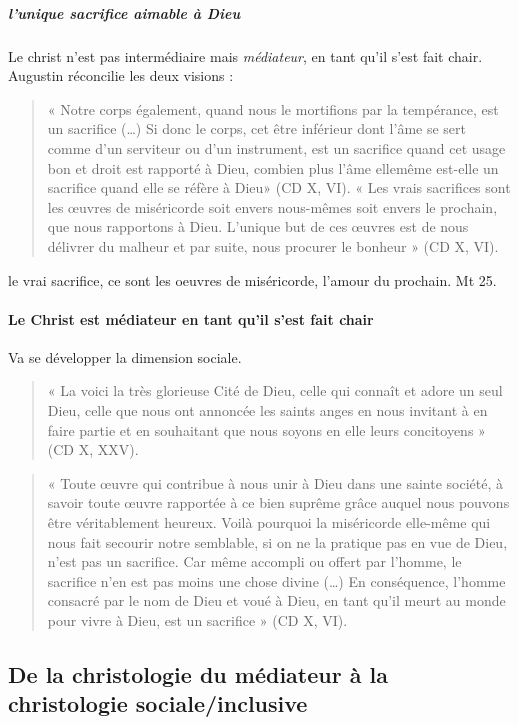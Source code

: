  \subparagraph{l'unique sacrifice aimable à Dieu}Le christ n'est pas intermédiaire mais \textit{médiateur}, en tant qu'il s'est fait chair. Augustin réconcilie les deux visions : 
   
  \begin{quote}
    « Notre corps également, quand nous le mortifions par la tempérance, est un sacrifice (…) Si donc le corps, cet être inférieur dont l’âme se sert comme d’un serviteur ou d’un instrument, est un sacrifice quand cet usage bon et droit est rapporté à Dieu, combien plus l’âme ellemême est-elle un sacrifice quand elle se réfère à Dieu» (CD X, VI).  « Les vrais sacrifices sont les œuvres de miséricorde soit envers nous-mêmes soit envers le prochain, que nous rapportons à Dieu. L’unique but de ces œuvres est de nous délivrer du malheur et par suite, nous procurer le bonheur » (CD X, VI). 
\end{quote}

le vrai sacrifice, ce sont les oeuvres de miséricorde, l'amour du prochain. Mt 25.

\paragraph{Le Christ est médiateur en tant qu’il s’est fait chair }    

Va se développer la dimension sociale.

\begin{quote}
    « La voici la très glorieuse Cité de Dieu, celle qui connaît et adore un seul Dieu, celle que nous ont annoncée les saints anges en nous invitant à en faire partie et en souhaitant que nous soyons en elle leurs concitoyens » (CD X, XXV).  
\end{quote}

\begin{quote}
    « Toute œuvre qui contribue à nous unir à Dieu dans une sainte société, à savoir toute œuvre rapportée à ce bien suprême grâce auquel nous pouvons être véritablement heureux. Voilà pourquoi la miséricorde elle-même qui nous fait secourir notre semblable, si on ne la pratique pas en vue de Dieu, n’est pas un sacrifice.  Car même accompli ou offert par l’homme, le sacrifice n’en est pas moins une chose divine (…) En conséquence, l’homme consacré par le nom de Dieu et voué à Dieu, en tant qu’il meurt au monde pour vivre à Dieu, est un sacrifice » (CD X, VI). 
\end{quote}
\subsection{De la christologie du médiateur à la christologie sociale/inclusive}    

